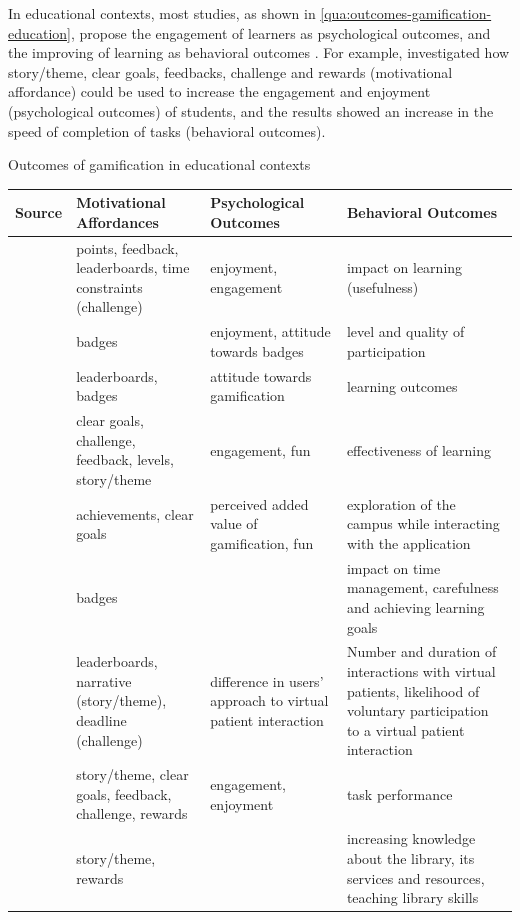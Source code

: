 In educational contexts, most studies, as shown in \autoref{qua:outcomes-gamification-education}, propose the engagement of learners as psychological outcomes, and the improving of learning as behavioral outcomes \cite{BorgesDurelliReisIsotani2014}.
For example,  investigated how story/theme, clear goals, feedbacks, challenge and rewards (motivational affordance) could be used to increase the engagement and enjoyment (psychological outcomes) of students, and the results showed an increase in the speed of completion of tasks (behavioral outcomes).


\begin{quadro}[htb]
\caption{Outcomes of gamification in educational contexts}
\label{qua:outcomes-gamification-education}
\centering
\footnotesize
\begin{tabular}{|p{3cm}|p{3.5cm}|p{3.5cm}|p{3.5cm}|} \hline
\textbf{Source} & \textbf{Motivational Affordances} & \textbf{Psychological Outcomes} & \textbf{Behavioral Outcomes} \\ \hline \hline
\cite{CheongCheongFilippou2013} & points, feedback, leaderboards, time constraints (challenge) & enjoyment, engagement & impact on learning (usefulness) \\ \hline
\cite{Denny2013} & badges & enjoyment, attitude towards badges & level and quality of participation \\ \hline
\cite{DominguezSaenz-de-Navarretede-MarcosFernandez-SanzPagesMartinez-Herraiz2013} & leaderboards, badges & attitude towards gamification & learning outcomes \\ \hline
\cite{DongDontchevaJosephKarahaliosNewmanAckerman2012} & clear goals, challenge, feedback, levels, story/theme & engagement, fun & effectiveness of learning \\ \hline
\cite{Fitz-WalterTjondronegoroWyeth2011} & achievements, clear goals & perceived added value of gamification, fun & exploration of the campus while interacting with the application \\ \hline
\cite{HakulinenAuvinenKorhonen2013} & badges & & impact on time management, carefulness and achieving learning goals \\ \hline
\cite{HalanRossenCendanLok2010} & leaderboards, narrative (story/theme), deadline (challenge) & difference in users' approach to virtual patient interaction & Number and duration of interactions with virtual patients, likelihood of voluntary participation to a virtual patient interaction \\ \hline
\cite{LiGrossmanFitzmaurice2012} & story/theme, clear goals, feedback, challenge, rewards & engagement, enjoyment & task performance \\ \hline
\cite{SmithBaker2011} & story/theme, rewards & & increasing knowledge about the library, its services and resources, teaching library skills \\ \hline
\end{tabular}
\end{quadro}



